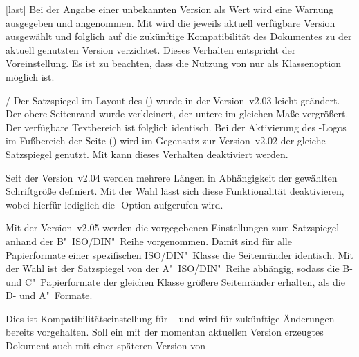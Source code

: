 \begin{Declaration*}{}
\begin{Declaration*}{}
\begin{Declaration*}{}
\begin{Declaration}[v2.03]{}[last]
Bei der Angabe einer unbekannten Version als Wert wird eine Warnung ausgegeben 
und  angenommen. Mit  wird die 
jeweils aktuell verfügbare Version ausgewählt und folglich auf die zukünftige 
Kompatibilität des Dokumentes zu der aktuell genutzten Version verzichtet. 
Dieses Verhalten entspricht der Voreinstellung. Es ist zu beachten, dass die 
Nutzung von  nur als Klassenoption möglich ist.
%
\begin{values}{}
\item[\PValue{first}/\PValue{2.02}]
  Der Satzspiegel im Layout des \CDs () wurde in 
  der Version~v2.03 leicht geändert. Der obere Seitenrand wurde verkleinert, 
  der untere im gleichen Maße vergrößert. Der verfügbare Textbereich ist 
  folglich identisch. Bei der Aktivierung des \DDC-Logos im Fußbereich der 
  Seite () wird im Gegensatz zur Version~v2.02 der 
  gleiche Satzspiegel genutzt. Mit  kann dieses 
  Verhalten deaktiviert werden.
\item[\PValue{2.03}]
  Seit der Version~v2.04 werden mehrere Längen in Abhängigkeit der gewählten 
  Schriftgröße definiert. Mit der Wahl  lässt sich diese 
  Funktionalität deaktivieren, wobei hierfür lediglich die \TUDScript-Option 
   aufgerufen wird. 
\item[\PValue{2.04}]
  Mit der Version~v2.05 werden die vorgegebenen Einstellungen zum Satzspiegel 
  anhand der B"~ISO/DIN"~Reihe vorgenommen. Damit sind für alle Papierformate 
  einer spezifischen ISO/DIN"~Klasse die Seitenränder identisch. Mit der Wahl 
   ist der Satzspiegel von der A"~ISO/DIN"~Reihe 
  abhängig, sodass die B- und C"~Papierformate der gleichen Klasse größere 
  Seitenränder erhalten, als die D- und A"~Formate.
\item[\PValue{2.05}]
  Dies ist Kompatibilitätseinstellung für \TUDScript~\vTUDScript{} und wird für 
  zukünftige Änderungen bereits vorgehalten. Soll ein mit der momentan 
  aktuellen Version erzeugtes Dokument auch mit einer späteren Version von 

\end{values}
\end{Declaration}
\end{Declaration*}
\end{Declaration*}
\end{Declaration*}
